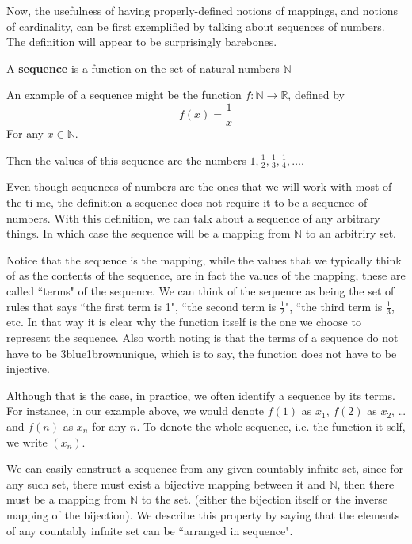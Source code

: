 \documentclass[../../templates/section]{subfiles}
\begin{document}
Now, the usefulness of having properly-defined notions of mappings, and notions 
of cardinality, can be first exemplified by talking about sequences of numbers. 
The definition will appear to be surprisingly barebones. 

\begin{definition}
A \textbf{sequence} is a function on the set of natural numbers $\mathbb{N}$
\end{definition}

An example of a sequence might be the function $f:\mathbb{N}\rightarrow \mathbb{R}$, 
defined by 
\[
f(x) = \frac{1}{x}
\]
For any $x\in \mathbb{N}$.

Then the values of this sequence are the numbers $1, \frac{1}{2}, \frac{1}{3}, 
\frac{1}{4}, \dots$. 

Even though sequences of numbers are the ones that we will work with most of 
the ti
me, the definition a sequence does not require it to be a sequence of numbers. 
With this definition, we can talk about a sequence of any arbitrary things. 
In which 
case the sequence will be a mapping from $\mathbb{N}$ to an arbitriry set.

Notice that the sequence is the mapping, while the values that we typically think 
of as the contents of the sequence, are in fact the values of the mapping, 
these are called  ``terms" of the sequence. We can think of the sequence as being 
the set of rules that says ``the first term is 1", ``the second term is $\frac{1}
{2}$", ``the third term is $\frac{1}{3}$, etc. In that way it is clear why the 
function itself is the one we choose to represent the sequence. Also worth noting 
is that the terms of a sequence do not have to be 3blue1brownunique, which is to 
say, the function does not have to be injective. 

Although that is the case, in practice, we often identify a sequence by its terms. 
For instance, in our example above, we would denote $f(1)$ as $x_1$, $f(2)$ as 
$x_2$, \dots and $f(n)$ as $x_n$ for any $n$. To denote the whole sequence, 
i.e. the function it self, we write $(x_n)$.

We can easily construct a sequence from any given countably infnite set, since 
for any such set, there must exist a bijective mapping between it and $\mathbb{N}$, 
then there must be a mapping from $\mathbb{N}$ to the set. (either the bijection 
itself or the inverse mapping of the bijection). We describe this property by 
saying that the elements of any countably infnite set can be ``arranged in sequence".
\end{document}
